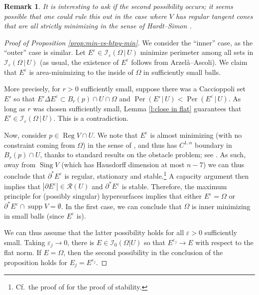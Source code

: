 \documentclass[12pt,twoside]{amsart}
\numberwithin{equation}{section}
\renewcommand{\leq}{\leqslant}
\newtheorem{remark}[theorem]{Remark}
\newcommand{\cI}{\mathcal I}
\renewcommand{\cR}{\mathcal R}
\DeclareMathOperator{\Per}{Per}
\DeclareMathOperator{\supp}{supp}
\newcommand{\eps}{\varepsilon}
\DeclareMathOperator{\sing}{Sing}
\DeclareMathOperator{\reg}{Reg}
\begin{document}
\begin{remark}
It is interesting to ask if the second possibility occurs; it seems possible that one could rule this out in the case where $V$ has regular tangent cones that are all strictly minimizing in the sense of Hardt--Simon \cite[\S 3]{HS}. 
\end{remark}


\begin{proof}[Proof of Proposition \ref{prop:min-vs-htpy-min}]
We consider the ``inner'' case, as the ``outer'' case is similar. Let $E^\eps \in \cI_\eps(\Omega\, |\, U)$ minimize perimeter among all sets in $\cI_\eps(\Omega\,|\, U)$ (as usual, the existence of $E^\eps$ follows from Arzel\`a--Ascoli). We claim that $E^\eps$ is area-minimizing to the inside of $\Omega$ in sufficiently small balls. 

More precisely, for $r>0$ sufficiently small, suppose there was a Caccioppoli set $E'$ so that $E'\Delta E^\eps \subset B_r(p) \cap U \cap \Omega$ and $\Per(E'\,|\,U) < \Per(E^\eps\,|\,U)$. As long as $r$ was chosen sufficiently small, Lemma \ref{l:close in flat} guarantees
that $E' \in \cI_\eps(\Omega\, |\,U)$. This is a contradiction. 

Now, consider $p \in \reg V \cap U$. We note that $E^\eps$ is almost minimizing (with no constraint coming from $\Omega$) in the sense of \cite{Tam}, and thus has $C^{1,\alpha}$ boundary in $B_r(p) \cap U$,  thanks to standard results on the obstacle problem; see \cite[\S 1.9, \S1.14(iv)]{Tam}. As such, away from $\sing V$ (which has Hausdorff dimension at most $n-7$) we can thus conclude that $\partial^*E^\eps$ is regular, stationary and stable.\footnote{Cf.\ the proof of \cite[Proposition 2.1]{Liu} for the proof of stability.} A capacity argument then implies that $|\partial E^\eps| \in \cR(U)$ and $\partial^*E^\eps$ is stable. Therefore, the maximum principle for (possibly singular) hypersurfaces \cite{Ilm} implies that either $E^\eps = \Omega$ or $\partial^*E^\eps \cap \supp V = \emptyset$. In the first case, we can conclude that $\Omega$ is inner minimizing in small balls (since $E^\eps$ is). 

We can thus assume that the latter possibility holds for all $\eps>0$ sufficiently small. Taking $\eps_j\to 0$, there is $E \in \cI_0(\Omega | U)$ so that $E^{\eps_j}\to E$ with respect to the flat norm. If $E=\Omega$, then the second possibility in the conclusion of the proposition holds for $E_j = E^{\eps_j}$. 


\end{proof}
\end{document}
